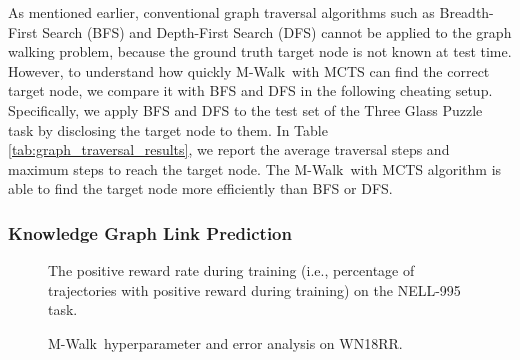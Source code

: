 \documentclass{article}
\newcommand{\modelname}{M-Walk}
\begin{document}
As mentioned earlier, conventional graph traversal algorithms such as Breadth-First Search (BFS) and Depth-First Search (DFS) cannot be applied to the graph walking problem, because the ground truth target node is not known at test time. However, to understand how quickly \modelname~with MCTS can find the correct target node, we compare it with BFS and DFS in the following cheating setup. Specifically, we apply BFS and DFS to the test set of the Three Glass Puzzle task by disclosing the target node to them. In Table \ref{tab:graph_traversal_results}, we report the average traversal steps and maximum steps to reach the target node. The \modelname~with MCTS algorithm is able to find the target node more efficiently than BFS or DFS.
	
	
	
	
	
	
	
	
\subsubsection{Knowledge Graph Link Prediction}
\label{Appendix:kbc}



\begin{figure}[t!]
		\centering
			 
			\caption{The positive reward rate during training (i.e., percentage of trajectories with positive reward during training) on the NELL-995 task.}
		\label{fig:kbc_train_success_train2}
	\end{figure}
	
	
	\begin{figure}[t!]
	\centering
	\caption{\modelname~hyperparameter and error analysis on WN18RR.}
	\label{fig:wn18rr_analysis2}
	\end{figure}
	
\end{document}
